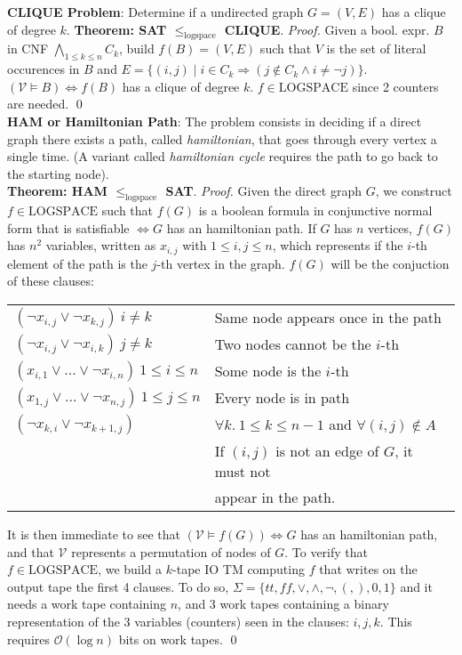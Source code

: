\documentclass[10pt,landscape]{article}
\newcommand{\impl}{\Rightarrow}
\newcommand{\V}{\mathcal{V}}
\renewcommand{\O}{\mathcal{O}}
\newcommand{\LOGSPACE}{\mathrm{LOGSPACE}}
\newcommand{\red}[1]{\leqslant_{#1}}
\renewcommand{\iff}{\Leftrightarrow}
\theoremstyle{plain}%
\theoremstyle{definition}
\theoremstyle{remark}
\begin{document}
\begin{multicols}{4}
\textbf{CLIQUE Problem}: Determine if a undirected graph $G = (V, E)$ has a clique 
of degree $k$. 
\textbf{Theorem: SAT $\red{\text{logspace}}$ CLIQUE}. \textit{Proof.} 
Given a bool. expr. $B$ in CNF $\bigwedge_{1 \leq k \leq n} C_k$, build $f(B) = (V, E)$ such that 
$V$ is the set of literal occurences in $B$ and $E = \{(i,j) \mid i \in C_k \impl (j \notin C_k \land i \neq \neg j)\}$.
$(\V \vDash B) \iff f(B)$ has a clique of degree $k$. $f \in \LOGSPACE$ since 2 counters are needed.
\qed \\[.2cm]

\textbf{HAM or Hamiltonian Path}:
The problem consists in deciding if a direct graph there exists a path, 
called \textit{hamiltonian}, that goes through every vertex a single time.
(A variant called \textit{hamiltonian cycle} requires the path to go back to the 
starting node). \\[.2cm]

\textbf{Theorem: HAM $\red{\text{logspace}}$ SAT}. \textit{Proof.} 
Given the direct graph $G$, we construct $f \in \LOGSPACE$ such that 
$f(G)$ is a boolean formula in conjunctive normal form
 that is satisfiable $\iff G$ has an hamiltonian path.
If $G$ has $n$ vertices, $f(G)$ has $n^2$ variables, written as
$x_{i,j}$ with $1 \leq i,j \leq n$, which represents if the $i$-th element 
of the path is the $j$-th vertex in the graph. $f(G)$ will be the conjuction of these clauses:
\begin{tabular}{@{}ll@{}}
$(\neg x_{i,j} \lor \neg x_{k,j})\  i \neq k$ & Same node appears once in the path\\
$(\neg x_{i,j} \lor \neg x_{i,k})\  j \neq k$ & Two nodes cannot be the $i$-th \\
$(x_{i,1} \lor \hdots \lor \neg x_{i,n})\  1 \leq i \leq n$ & Some node is the $i$-th \\
$(x_{1,j} \lor \hdots \lor \neg x_{n,j})\  1 \leq j \leq n$ & Every node is in path \\
$(\neg x_{k,i} \lor \neg x_{k+1, j})$ & $\forall k.\ 1 \leq k \leq n-1$ and $\forall(i,j) \notin A$\\
& If $(i,j)$ is not an edge of $G$, it must not \\
& appear in the path.
\end{tabular}
It is then immediate to see that $(\V \vDash f(G)) \iff G$ has an hamiltonian path,
and that $\V$ represents a permutation of nodes of $G$. To verify that $f \in \LOGSPACE$,
we build a $k$-tape IO TM computing $f$ that writes on the output tape the first 4 clauses.
To do so, $\Sigma = \{tt,ff, \lor, \land, \neg, (,), 0, 1\}$ and it needs a work tape containing $n$, and 3 work tapes containing a binary representation
of the 3 variables (counters) seen in the clauses: $i,j,k$. This requires $\O(\log n)$ bits on work
tapes. \qed \\[.2cm]


\end{multicols}
\end{document}
